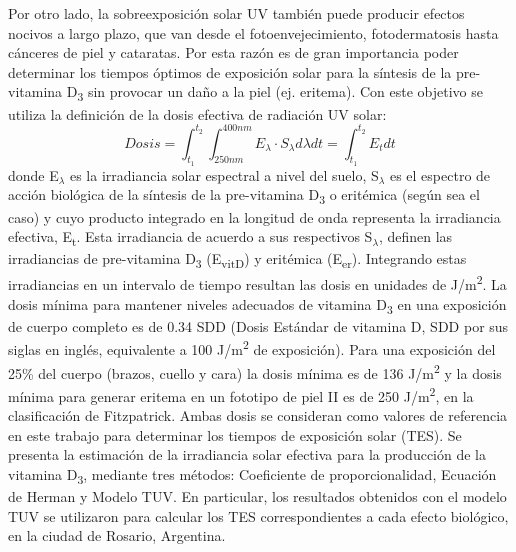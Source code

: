 \documentclass[10pt,twocolumn]{article}
\begin{document}
Por otro lado, la sobreexposición solar UV también puede producir efectos nocivos a largo plazo, que van desde el fotoenvejecimiento, fotodermatosis hasta cánceres de piel y cataratas.\cite{Gilaberte2011,Modenese2016} Por esta razón es de gran importancia poder determinar los tiempos óptimos de exposición solar para la síntesis de la pre-vitamina D\textsubscript{3} sin provocar un daño a la piel (ej. eritema). Con este objetivo se utiliza la definición de la dosis efectiva de radiación UV solar:
\begin{equation}
  Dosis=\int_{t_1}^{t_2} \int_{250nm}^{400nm} E_\lambda\cdot S_\lambda d\lambda dt = \int_{t_1}^{t_2}E_tdt \label{eq:dosis}
\end{equation}
donde E$_\lambda$ es la irradiancia solar espectral a nivel del suelo, S$_\lambda$ es el espectro de acción biológica de la síntesis de la pre-vitamina D\textsubscript{3} o eritémica (según sea el caso) y cuyo producto integrado en la longitud de onda representa la irradiancia efectiva, E\textsubscript{t}. Esta irradiancia de acuerdo a sus respectivos S$_\lambda$, definen las irradiancias de pre-vitamina D\textsubscript{3} (E\textsubscript{vitD}) y eritémica (E\textsubscript{er}). Integrando estas irradiancias en un intervalo de tiempo resultan las dosis en unidades de J/m\textsuperscript{2}.
La dosis mínima para mantener niveles adecuados de vitamina D\textsubscript{3} en una exposición de cuerpo completo es de 0.34 SDD (Dosis Estándar de vitamina D, SDD por sus siglas en inglés, equivalente a 100 J/m\textsuperscript{2} de exposición). Para una exposición del 25\% del cuerpo (brazos, cuello y cara) la dosis mínima es de 136 J/m\textsuperscript{2} y la dosis mínima para generar eritema en un fototipo de piel II es de 250 J/m\textsuperscript{2}, en la clasificación de Fitzpatrick.\cite{Fitzpatrick1988,UVDoses,Fioletov_2010} Ambas dosis se consideran como valores de referencia en este trabajo para determinar los tiempos de exposición solar (TES). Se presenta la estimación de la irradiancia solar efectiva para la producción de la vitamina D\textsubscript{3}, mediante tres métodos: Coeficiente de proporcionalidad,\cite{UVDoses} Ecuación de Herman\cite{Herman2010} y Modelo TUV.\cite{Madronich1987} En particular, los resultados obtenidos con el modelo TUV se utilizaron para calcular los TES correspondientes a cada efecto biológico, en la ciudad de Rosario, Argentina.
\end{document}
